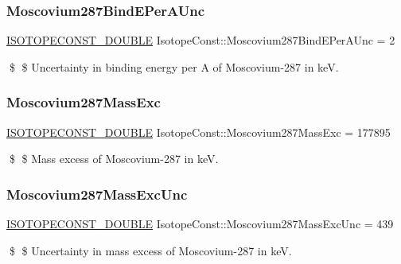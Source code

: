 \subsubsection{\texorpdfstring{Moscovium287\+Bind\+E\+Per\+A\+Unc}{Moscovium287BindEPerAUnc}}
{\footnotesize\ttfamily \mbox{\hyperlink{group___isotope_const-_macros_ga8f45a7272ce02c0b4c65c44636ed719a}{I\+S\+O\+T\+O\+P\+E\+C\+O\+N\+S\+T\+\_\+\+D\+O\+U\+B\+LE}} Isotope\+Const\+::\+Moscovium287\+Bind\+E\+Per\+A\+Unc = 2}

\$ \$ Uncertainty in binding energy per A of Moscovium-\/287 in keV. \mbox{\label{group___isotope_const-_moscovium-_mc287_gaa7438b0f2559e750458a0abe62fa19a6}} 
\subsubsection{\texorpdfstring{Moscovium287\+Mass\+Exc}{Moscovium287MassExc}}
{\footnotesize\ttfamily \mbox{\hyperlink{group___isotope_const-_macros_ga8f45a7272ce02c0b4c65c44636ed719a}{I\+S\+O\+T\+O\+P\+E\+C\+O\+N\+S\+T\+\_\+\+D\+O\+U\+B\+LE}} Isotope\+Const\+::\+Moscovium287\+Mass\+Exc = 177895}

\$ \$ Mass excess of Moscovium-\/287 in keV. \mbox{\label{group___isotope_const-_moscovium-_mc287_ga7b90cb4fb83233ef53e0f737caacb594}} 
\subsubsection{\texorpdfstring{Moscovium287\+Mass\+Exc\+Unc}{Moscovium287MassExcUnc}}
{\footnotesize\ttfamily \mbox{\hyperlink{group___isotope_const-_macros_ga8f45a7272ce02c0b4c65c44636ed719a}{I\+S\+O\+T\+O\+P\+E\+C\+O\+N\+S\+T\+\_\+\+D\+O\+U\+B\+LE}} Isotope\+Const\+::\+Moscovium287\+Mass\+Exc\+Unc = 439}

\$ \$ Uncertainty in mass excess of Moscovium-\/287 in keV. \mbox{\label{group___isotope_const-_moscovium-_mc287_ga7e37d696ff5271eb0316f010ba192c84}} 
